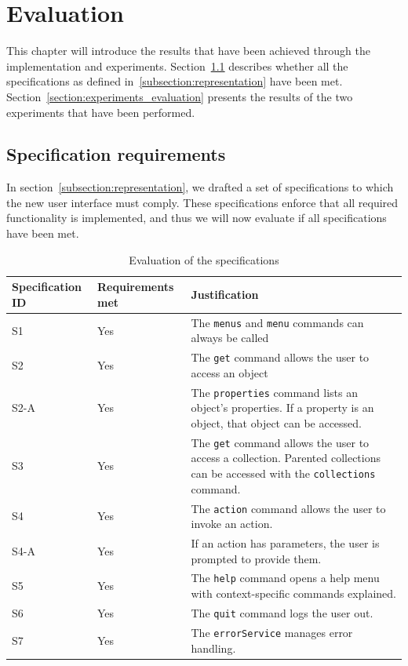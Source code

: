 \chapter{Evaluation}
\label{chapter:evaluation}
This chapter will introduce the results that have been achieved through the implementation and experiments. Section~\ref{section:specificationrequirements} describes whether all the specifications as defined in~\ref{subsection:representation} have been met. Section~\ref{section:experiments_evaluation} presents the results of the two experiments that have been performed.

\section{Specification requirements}
\label{section:specificationrequirements}
In section~\ref{subsection:representation}, we drafted a set of specifications to which the new user interface must comply. These specifications enforce that all required functionality is implemented, and thus we will now evaluate if all specifications have been met.

\begin{table}[H]
	\center

	\begin{tabularx}{\textwidth}{llX}
		\toprule
		Specification ID		&	Requirements met		& Justification \\
		\midrule
		S1		& Yes								& The \texttt{menus} and \texttt{menu} commands can always be called \\
		S2		& Yes								& The \texttt{get} command allows the user to access an object\\
		S2-A	& Yes								& The \texttt{properties} command lists an object's properties. If a property is an object, that object can be accessed.\\
		S3		& Yes								& The \texttt{get} command allows the user to access a collection. Parented collections can be accessed with the \texttt{collections} command.\\
		S4		& Yes								& The \texttt{action} command allows the user to invoke an action. \\
		S4-A	& Yes								& If an action has parameters, the user is prompted to provide them. \\
		S5		& Yes								& The \texttt{help} command opens a help menu with context-specific commands explained. \\
		S6		& Yes								& The \texttt{quit} command logs the user out. \\
		S7		& Yes								& The \texttt{errorService} manages error handling. \\
		\bottomrule
	\end{tabularx}
	
	\caption{Evaluation of the specifications}
	\label{table:specificationevaluation}
		
\end{table}

